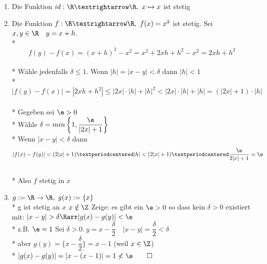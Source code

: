 \begin{enumerate}
\item{Die Funktion $id:\R→\R,\ x\mapsto x$ ist stetig}
\item{Die Funktion $f:\R→\R,\ f(x)=x^2$ ist stetig. %
\bew
Sei $x,y\in\R\quad y=x+h$.\\*
$$f(y)-f(x)=(x+h)^2-x^2=x^2+2xh+h^2-x^2=2xh+h^2$$\\*
Wähle jedenfalls $\delta\leq 1$. Wenn $|h|=|x-y|<\delta$ dann $|h|<1$\\*
$$|f(y)-f(x)|=|2xh+h^2|\leq|2x|·|h|+|h|^2<|2x|·|h|+|h|=(|2x|+1)·|h|$$\\*
Gegeben sei $\e>0$\\*
Wähle $\delta=min\left\{1,\dfrac{\e}{|2x|+1}\right\}$\\*
Wenn $|x-y|<\delta$ dann $$|f(x)-f(y)|<(2|x|+1)·|h|<(2|x|+1)·\dfrac{\e}{2|x|+1}=\e$$\\*
Also $f$ stetig in $x$}
\item{$g:=\R \to \R,\ g(x):=\{x\}$\\*
g ist stetig an $x$ \equ $x\notin\Z$
Zeige: es gibt ein $\e>0$ so dass kein $\delta>0$ existiert mit: $|x-y|>\delta\Rarr|g(x)-g(y)|<\e$\\*
z.B. $\e=1$ Sei $\delta>0.\ y=x-\dfrac{\delta}{2}\quad |x-y|=\dfrac{\delta}{2}<\delta$\\*
aber $g(y)=\{x-\dfrac{\delta}{2}\}=x-1$ (weil $x\in\Z$)\\*
$|g(x)-g(y)|=|x-(x-1)|=1 \not<\e\qed$}
\end{enumerate}

